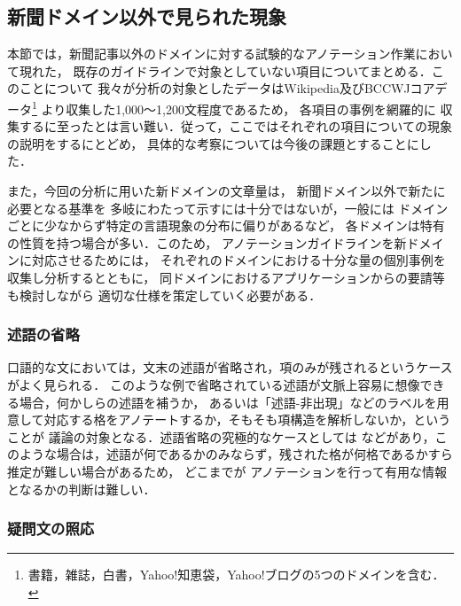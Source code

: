 \documentclass[japanese]{jnlp_1.4}
\begin{document}
\subsection{新聞ドメイン以外で見られた現象}
\label{sec:other-domains}

本節では，新聞記事以外のドメインに対する試験的なアノテーション作業において現れた，
既存のガイドラインで対象としていない項目についてまとめる．このことについて
我々が分析の対象としたデータはWikipedia及びBCCWJコアデータ\footnote{書籍，雑誌，白書，Yahoo!知恵袋，Yahoo!ブログの5つのドメインを含む．}
より収集した1,000〜1,200文程度であるため，
各項目の事例を網羅的に
収集するに至ったとは言い難い．従って，ここではそれぞれの項目についての現象の説明をするにとどめ，
具体的な考察については今後の課題とすることにした．

また，今回の分析に用いた新ドメインの文章量は，
新聞ドメイン以外で新たに必要となる基準を
多岐にわたって示すには十分ではないが，一般には
ドメインごとに少なからず特定の言語現象の分布に偏りがあるなど，
各ドメインは特有の性質を持つ場合が多い．このため，
アノテーションガイドラインを新ドメインに対応させるためには，
それぞれのドメインにおける十分な量の個別事例を収集し分析するとともに，
同ドメインにおけるアプリケーションからの要請等も検討しながら
適切な仕様を策定していく必要がある．


\subsubsection{述語の省略}
\label{sec:pred-omission}

口語的な文においては，文末の述語が省略され，項のみが残されるというケースがよく見られる．
このような例で省略されている述語が文脈上容易に想像できる場合，何かしらの述語を補うか，
あるいは「述語-非出現」などのラベルを用意して対応する格をアノテートするか，そもそも項構造を解析しないか，ということが
議論の対象となる．述語省略の究極的なケースとしては
などがあり，このような場合は，述語が何であるかのみならず，残された格が何格であるかすら推定が難しい場合があるため，
どこまでが
アノテーションを行って有用な情報となるかの判断は難しい．


\subsubsection{疑問文の照応}
\label{sec:question}
\end{document}
